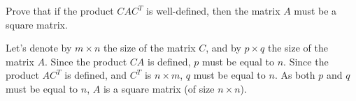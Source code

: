 

\begin{Exercise}[
name={},
title={}, 
difficulty=0,
origin={\cite{MB}}]
Prove that if the product $CAC^T$ is well-defined, then the matrix $A$ must be a square matrix.
\end{Exercise}

\begin{Answer}
Let's denote by $m \times n$ the size of the matrix $C$, and by $p \times q$ the size of the matrix $A$. Since the product $CA$ is defined, $p$ must be equal to $n$. Since the product $AC^T$ is defined, and $C^T$ is $n \times m$, $q$ must be equal to $n$. As both $p$ and $q$ must be equal to $n$, $A$ is a square matrix (of size $n \times n$).

\end{Answer}
